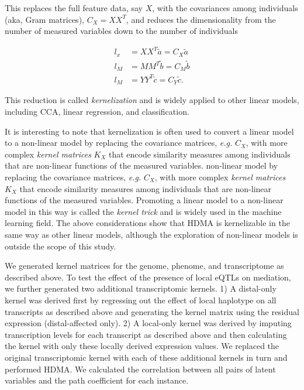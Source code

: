 \documentclass[
]{article}
\begin{document}
This replaces the full feature data, say \(X\), with the covariances
among individuals (aka, Gram matrices), \(C_X = XX^T\), and reduces the
dimensionality from the number of measured variables down to the number
of individuals

\begin{align}
l_x &= XX^T \tilde{a} = C_X \tilde{a} \\
l_M &= MM^T \tilde{b} = C_M \tilde{b} \\
l_M &= YY^T \tilde{c} = C_Y \tilde{c}.
\end{align}

This reduction is called \textit{kernelization}
\cite{tenenhaus2015kernel} and is widely applied to other linear models,
including CCA, linear regression, and classification.

It is interesting to note that kernelization is often used to convert a
linear model to a non-linear model by replacing the covariance matrices,
\textit{e.g.} \(C_X\), with more complex \textit{kernel matrices}
\(K_X\) that encode similarity measures among individuals that are
non-linear functions of the measured variables. non-linear model by
replacing the covariance matrices, \textit{e.g.} \(C_X\), with more
complex \textit{kernel matrices} \(K_X\) that encode similarity measures
among individuals that are non-linear functions of the measured
variables. Promoting a linear model to a non-linear model in this way is
called the \textit{kernel trick} and is widely used in the machine
learning field. The above considerations show that HDMA is kernelizable
in the same way as other linear models, although the exploration of
non-linear models is outside the scope of this study.

We generated kernel matrices for the genome, phenome, and transcriptome
as described above. To test the effect of the presence of local eQTLs on
mediation, we further generated two additional transcriptomic kernels.
1) A distal-only kernel was derived first by regressing out the effect
of local haplotype on all transcripts as described above and generating
the kernel matrix using the residual expression (distal-affected only).
2) A local-only kernel was derived by imputing transcription levels for
each transcript as described above and then calculating the kernel with
only these locally derived expression values. We replaced the original
transcriptomic kernel with each of these additional kernels in turn and
performed HDMA. We calculated the correlation between all pairs of
latent variables and the path coefficient for each instance.
\end{document}
